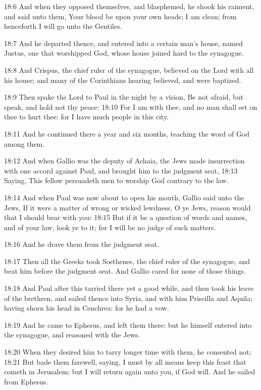 18:6 And when they opposed themselves, and blasphemed, he shook his raiment, and said unto them, Your blood be upon your own heads; I am clean; from henceforth I will go unto the Gentiles.

18:7 And he departed thence, and entered into a certain man's house, named Justus, one that worshipped God, whose house joined hard to the synagogue.

18:8 And Crispus, the chief ruler of the synagogue, believed on the Lord with all his house; and many of the Corinthians hearing believed, and were baptized.

18:9 Then spake the Lord to Paul in the night by a vision, Be not afraid, but speak, and hold not thy peace: 18:10 For I am with thee, and no man shall set on thee to hurt thee: for I have much people in this city.

18:11 And he continued there a year and six months, teaching the word of God among them.

18:12 And when Gallio was the deputy of Achaia, the Jews made insurrection with one accord against Paul, and brought him to the judgment seat, 18:13 Saying, This fellow persuadeth men to worship God contrary to the law.

18:14 And when Paul was now about to open his mouth, Gallio said unto the Jews, If it were a matter of wrong or wicked lewdness, O ye Jews, reason would that I should bear with you: 18:15 But if it be a question of words and names, and of your law, look ye to it; for I will be no judge of such matters.

18:16 And he drave them from the judgment seat.

18:17 Then all the Greeks took Sosthenes, the chief ruler of the synagogue, and beat him before the judgment seat. And Gallio cared for none of those things.

18:18 And Paul after this tarried there yet a good while, and then took his leave of the brethren, and sailed thence into Syria, and with him Priscilla and Aquila; having shorn his head in Cenchrea: for he had a vow.

18:19 And he came to Ephesus, and left them there: but he himself entered into the synagogue, and reasoned with the Jews.

18:20 When they desired him to tarry longer time with them, he consented not; 18:21 But bade them farewell, saying, I must by all means keep this feast that cometh in Jerusalem: but I will return again unto you, if God will. And he sailed from Ephesus.

